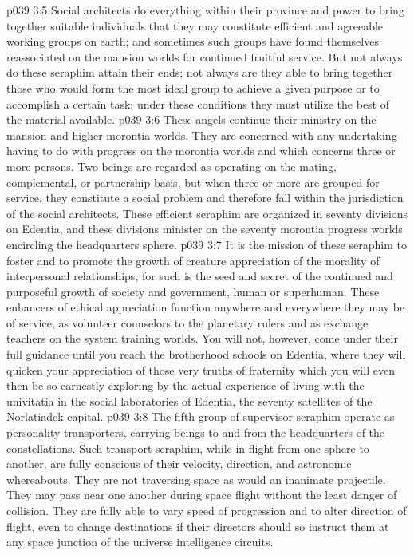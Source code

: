 \vs p039 3:5 Social architects do everything within their province and power to bring together suitable individuals that they may constitute efficient and agreeable working groups on earth; and sometimes such groups have found themselves reassociated on the mansion worlds for continued fruitful service. But not always do these seraphim attain their ends; not always are they able to bring together those who would form the most ideal group to achieve a given purpose or to accomplish a certain task; under these conditions they must utilize the best of the material available.
\vs p039 3:6 These angels continue their ministry on the mansion and higher morontia worlds. They are concerned with any undertaking having to do with progress on the morontia worlds and which concerns three or more persons. Two beings are regarded as operating on the mating, complemental, or partnership basis, but when three or more are grouped for service, they constitute a social problem and therefore fall within the jurisdiction of the social architects. These efficient seraphim are organized in seventy divisions on Edentia, and these divisions minister on the seventy morontia progress worlds encircling the headquarters sphere.
\vs p039 3:7 \pc {}\bibnobreakspace {} It is the mission of these seraphim to foster and to promote the growth of creature appreciation of the morality of interpersonal relationships, for such is the seed and secret of the continued and purposeful growth of society and government, human or superhuman. These enhancers of ethical appreciation function anywhere and everywhere they may be of service, as volunteer counselors to the planetary rulers and as exchange teachers on the system training worlds. You will not, however, come under their full guidance until you reach the brotherhood schools on Edentia, where they will quicken your appreciation of those very truths of fraternity which you will even then be so earnestly exploring by the actual experience of living with the univitatia in the social laboratories of Edentia, the seventy satellites of the Norlatiadek capital.
\vs p039 3:8 \pc {}\bibnobreakspace {} The fifth group of supervisor seraphim operate as personality transporters, carrying beings to and from the headquarters of the constellations. Such transport seraphim, while in flight from one sphere to another, are fully conscious of their velocity, direction, and astronomic whereabouts. They are not traversing space as would an inanimate projectile. They may pass near one another during space flight without the least danger of collision. They are fully able to vary speed of progression and to alter direction of flight, even to change destinations if their directors should so instruct them at any space junction of the universe intelligence circuits.
